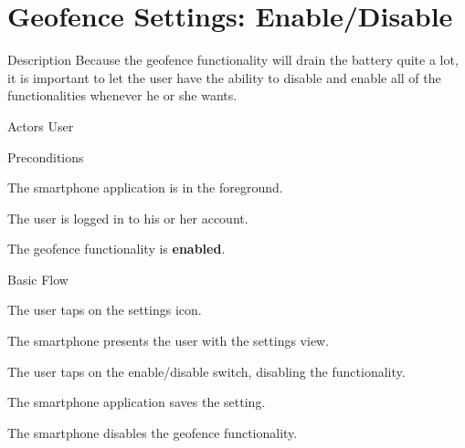 \section{Geofence Settings: Enable/Disable}

%
\begin{cpart}{Description}
Because the geofence functionality will drain the battery quite a lot, it is important to let the user have the ability to disable and enable all of the functionalities whenever he or she wants.
\end{cpart}


%
\begin{cpart}{Actors}
User
\end{cpart}

%
\begin{cpartList}{Preconditions}
\item The smartphone application is in the foreground.
\item The user is logged in to his or her account.
\item The geofence functionality is \textbf{enabled}.
\end{cpartList}

%
\begin{cpartList}{Basic Flow}
  \item The user taps on the settings icon.
  \item The smartphone presents the user with the settings view.
  \item The user taps on the enable/disable switch, disabling the functionality.
  \item The smartphone application saves the setting.
  \item The smartphone disables the geofence functionality.
\end{cpartList}

